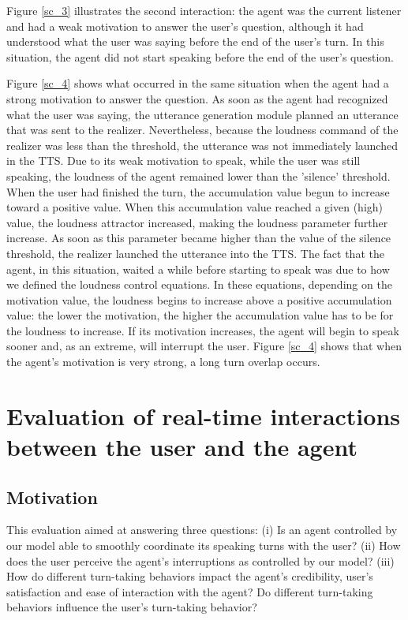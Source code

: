 \documentclass[twocolumn]{svjour3}
\begin{document}
Figure \ref{sc_3} illustrates the second interaction: the agent was the current listener and had a weak motivation to answer the user's question, although it had understood what the user was saying before the end of the user's turn. In this situation, the agent did not start speaking before the end of the user's question. 

Figure \ref{sc_4} shows what occurred in the same situation when the agent had a strong motivation to answer the question. 
As soon as the agent had recognized what the user was saying, the utterance generation module planned an utterance that was sent to the realizer. Nevertheless, because the loudness command of the realizer was less than the threshold, the utterance was not immediately launched in the TTS. 
Due to its weak motivation to speak, while the user was still speaking, the loudness of the agent remained lower than the 'silence' threshold. When the user had finished the turn, the accumulation value begun to increase toward a positive value. When this accumulation value reached a given (high) value, the loudness attractor increased, making the loudness parameter further increase. As soon as this parameter became higher than the value of the silence threshold, the realizer launched the utterance into the TTS.
The fact that the agent, in this situation, waited a while before starting to speak was due to how we defined the loudness control equations. In these equations, depending on the motivation value, the loudness begins to increase above a positive accumulation value: the lower the motivation, the higher the accumulation value has to be for the loudness to increase. If its motivation increases, the agent will begin to speak sooner and, as an extreme, will interrupt the user. Figure \ref{sc_4} shows that when the agent's motivation is very strong, a long turn overlap occurs. 

\section{Evaluation of real-time interactions between the user and the agent}
\label{sec:eval}

\subsection{Motivation}
\label{subsec:mot}

This evaluation aimed at answering three questions: 
(i) Is an agent controlled by our model able to smoothly coordinate its speaking turns with the user?
(ii) How does the user perceive the agent's interruptions as controlled by our model?
(iii) How do different turn-taking behaviors impact the agent's credibility, user's satisfaction and ease of interaction with the agent? Do different turn-taking behaviors influence the user's turn-taking behavior? 
\end{document}
